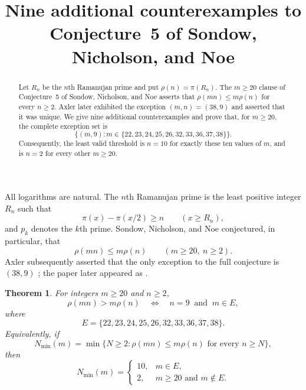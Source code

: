 \documentclass[11pt]{amsart}
\title[Additional Ramanujan-prime exceptions]
{Nine additional counterexamples to Conjecture~5 of Sondow, Nicholson, and Noe}
\date{}
\newtheorem{theorem}{Theorem}
\begin{document}
\begin{abstract}
Let $R_n$ be the $n$th Ramanujan prime and put
$\rho(n)=\pi(R_n)$.  The $m\geq20$ clause of Conjecture~5 of
Sondow, Nicholson, and Noe asserts that
$\rho(mn)\leq m\rho(n)$ for every $n\geq2$.
Axler later exhibited the exception $(m,n)=(38,9)$ and asserted that it
was unique.  We give nine additional counterexamples and prove that, for
$m\geq20$, the complete exception set is
\[
 \{(m,9):m\in\{22,23,24,25,26,32,33,36,37,38\}\}.
\]
Consequently, the least valid threshold is $n=10$ for exactly these ten
values of $m$, and is $n=2$ for every other $m\geq20$.
\end{abstract}

\maketitle

All logarithms are natural.  The $n$th Ramanujan prime is the least
positive integer $R_n$ such that
\[
 \pi(x)-\pi(x/2)\geq n \qquad (x\geq R_n),
\]
and $p_k$ denotes the $k$th prime.  Sondow, Nicholson, and Noe
\cite[Conjecture~5]{SNN} conjectured, in particular, that
\begin{equation}\label{eq:conjecture}
 \rho(mn)\leq m\rho(n) \qquad (m\geq20,\ n\geq2).
\end{equation}
Axler subsequently asserted that the only exception to the full
conjecture is $(38,9)$ \cite[Theorem~1.7]{Axler17}; the paper later
appeared as \cite{Axler20}.

\begin{theorem}\label{thm:main}
For integers $m\geq20$ and $n\geq2$,
\[
 \rho(mn)>m\rho(n)
 \quad\Longleftrightarrow\quad
 n=9\ \text{ and }\
 m\in E,
\]
where
\[
 E=\{22,23,24,25,26,32,33,36,37,38\}.
\]
Equivalently, if
\[
 N_{\min}(m)=\min\{N\geq2:\rho(mn)\leq m\rho(n)
                         \text{ for every }n\geq N\},
\]
then
\[
 N_{\min}(m)=
 \begin{cases}
  10,&m\in E,\\
  2,&m\geq20\text{ and }m\notin E.
 \end{cases}
\]
\end{theorem}
\end{document}

